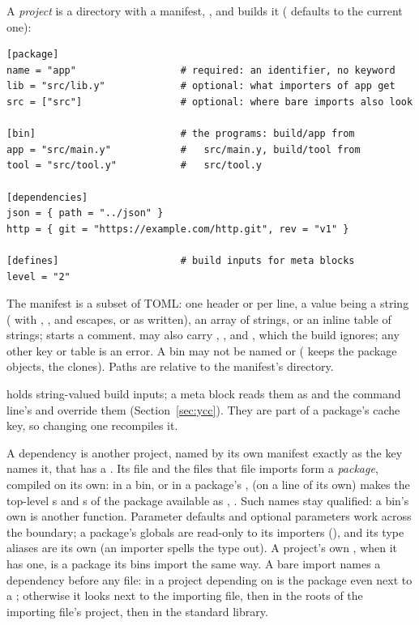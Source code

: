 A \emph{project} is a directory with a manifest, , and
 builds it ( defaults to the current one):

\begin{lstlisting}
[package]
name = "app"                  # required: an identifier, no keyword
lib = "src/lib.y"             # optional: what importers of app get
src = ["src"]                 # optional: where bare imports also look

[bin]                         # the programs: build/app from
app = "src/main.y"            #   src/main.y, build/tool from
tool = "src/tool.y"           #   src/tool.y

[dependencies]
json = { path = "../json" }
http = { git = "https://example.com/http.git", rev = "v1" }

[defines]                     # build inputs for meta blocks
level = "2"
\end{lstlisting}

\noindent The manifest is a subset of TOML: one \ic{[table]} header or
 per line, a value being a string ( with
\ic{\textbackslash\textbackslash}, ,
 and  escapes, or
 as written), an array of strings, or an inline table of
strings; \ic{\#} starts a comment. \ic{[package]} may also carry
, ,  and , which
the build ignores; any other key or table is an error. A bin may not be
named  or  ( keeps the package objects,
 the clones). Paths are relative to the manifest's
directory.

\ic{[defines]} holds string-valued build inputs; a meta block reads them as
 and the command line's  and  override them
(Section~\ref{sec:ycc}). They are part of a package's cache key, so changing
one recompiles it.

A dependency is another project, named by its own manifest exactly as
the key names it, that has a . Its  file and the files
that file imports form a \emph{package}, compiled on its own: in a bin,
or in a package's ,  (on a line of its own)
makes the top-level s and s of the  package
available as , . Such names stay
qualified: a bin's own  is another function. Parameter
defaults and optional parameters work across the boundary; a package's
globals are read-only to its importers (), and its type aliases are its own (an importer spells
the type out). A project's own , when it has one, is a package
its bins import the same way. A bare import names a dependency before
any file:  in a project depending on  is the
package even next to a ; otherwise it looks next to the
importing file, then in the  roots of the importing file's
project, then in the standard library.

